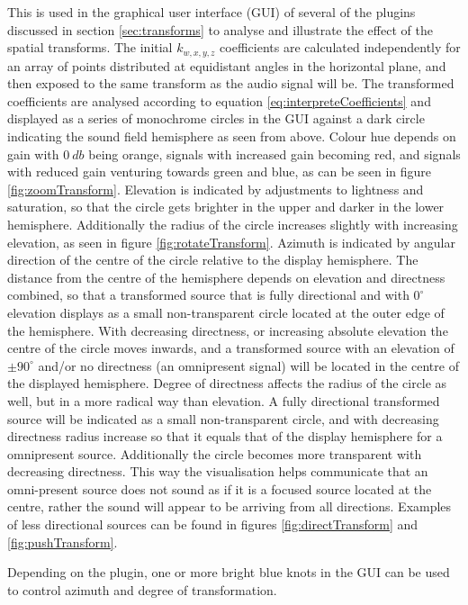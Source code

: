 \documentclass{article}
\begin{document}
This is used in the graphical user interface (GUI) of several of the plugins discussed in section \ref{sec:transforms} to analyse and illustrate the effect of the spatial transforms. 
The initial $k_{w, x, y, z}$ coefficients are calculated independently for an array of points distributed at equidistant angles in the horizontal plane, and then exposed to the same transform as the audio signal will be. 
The transformed coefficients are analysed according to equation \ref{eq:interpreteCoefficients} and displayed as a series of monochrome circles in the GUI against a dark circle indicating the sound field hemisphere as seen from above.
Colour hue depends on gain with $0\: db$ being orange, signals with increased gain becoming red, and signals with reduced gain venturing towards green and blue, as can be seen in figure \ref{fig:zoomTransform}.
Elevation is indicated by adjustments to lightness and saturation, so that the circle gets brighter in the upper and darker in the lower hemisphere.
Additionally the radius of the circle increases slightly with increasing elevation, as seen in figure \ref{fig:rotateTransform}.
Azimuth is indicated by angular direction of the centre of the circle relative to the display hemisphere.
The distance from the centre of the hemisphere depends on elevation and directness combined, so that a transformed source that is fully directional and with $0^{\circ}$ elevation displays as a small non-transparent circle located at the outer edge of the hemisphere.
With decreasing directness, or increasing absolute elevation the centre of the circle moves inwards, and a transformed source with an elevation of $\pm 90^{\circ}$ and/or no directness (an omnipresent signal) will be located in the centre of the displayed hemisphere.
Degree of directness affects the radius of the circle as well, but in a more radical way than elevation. A fully directional transformed source will be indicated as a small non-transparent circle, and with decreasing directness radius increase so that it equals that of the display hemisphere for a omnipresent source.
Additionally the circle becomes more transparent with decreasing directness.
This way the visualisation helps communicate that an omni-present source does not sound as if it is a focused source located at the centre, rather the sound will appear to be arriving from all directions.
Examples of less directional sources can be found in figures \ref{fig:directTransform} and \ref{fig:pushTransform}.

Depending on the plugin, one or more bright blue knots in the GUI can be used to control azimuth and degree of transformation.
\end{document}
